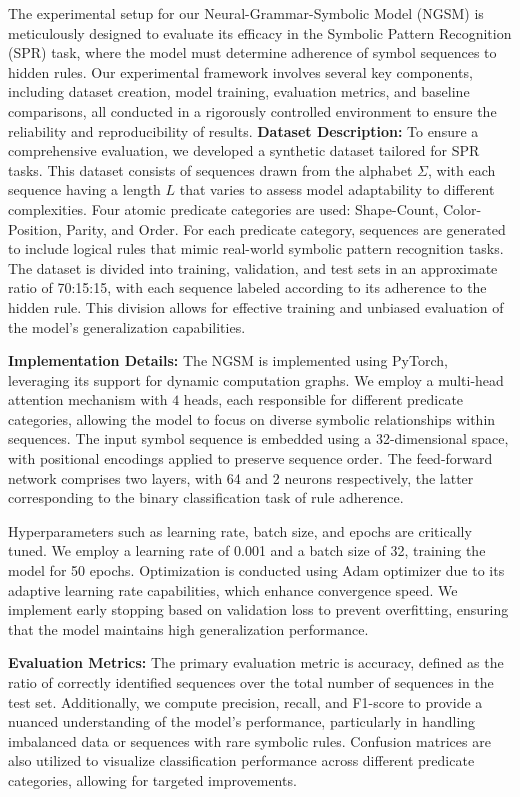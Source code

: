 \documentclass{article}
\begin{document}
The experimental setup for our Neural-Grammar-Symbolic Model (NGSM) is meticulously designed to evaluate its efficacy in the Symbolic Pattern Recognition (SPR) task, where the model must determine adherence of symbol sequences to hidden rules. Our experimental framework involves several key components, including dataset creation, model training, evaluation metrics, and baseline comparisons, all conducted in a rigorously controlled environment to ensure the reliability and reproducibility of results.
\textbf{Dataset Description:} To ensure a comprehensive evaluation, we developed a synthetic dataset tailored for SPR tasks. This dataset consists of sequences drawn from the alphabet $\Sigma$, with each sequence having a length $L$ that varies to assess model adaptability to different complexities. Four atomic predicate categories are used: Shape-Count, Color-Position, Parity, and Order. For each predicate category, sequences are generated to include logical rules that mimic real-world symbolic pattern recognition tasks. The dataset is divided into training, validation, and test sets in an approximate ratio of 70:15:15, with each sequence labeled according to its adherence to the hidden rule. This division allows for effective training and unbiased evaluation of the model's generalization capabilities.

\textbf{Implementation Details:} The NGSM is implemented using PyTorch, leveraging its support for dynamic computation graphs. We employ a multi-head attention mechanism with $4$ heads, each responsible for different predicate categories, allowing the model to focus on diverse symbolic relationships within sequences. The input symbol sequence is embedded using a 32-dimensional space, with positional encodings applied to preserve sequence order. The feed-forward network comprises two layers, with 64 and 2 neurons respectively, the latter corresponding to the binary classification task of rule adherence.

Hyperparameters such as learning rate, batch size, and epochs are critically tuned. We employ a learning rate of 0.001 and a batch size of 32, training the model for 50 epochs. Optimization is conducted using Adam optimizer due to its adaptive learning rate capabilities, which enhance convergence speed. We implement early stopping based on validation loss to prevent overfitting, ensuring that the model maintains high generalization performance.

\textbf{Evaluation Metrics:} The primary evaluation metric is accuracy, defined as the ratio of correctly identified sequences over the total number of sequences in the test set. Additionally, we compute precision, recall, and F1-score to provide a nuanced understanding of the model's performance, particularly in handling imbalanced data or sequences with rare symbolic rules. Confusion matrices are also utilized to visualize classification performance across different predicate categories, allowing for targeted improvements.
\end{document}
